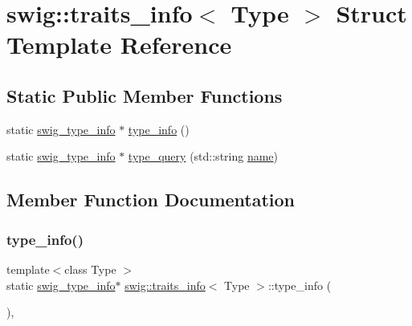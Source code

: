 \hypertarget{structswig_1_1traits__info}{}\section{swig\+:\+:traits\+\_\+info$<$ Type $>$ Struct Template Reference}
\label{structswig_1_1traits__info}
\subsection*{Static Public Member Functions}
\begin{DoxyCompactItemize}
\item 
static \hyperlink{structswig__type__info}{swig\+\_\+type\+\_\+info} $\ast$ \hyperlink{structswig_1_1traits__info_acfa11e9ee91b0e0319bf8a3707f71084}{type\+\_\+info} ()
\item 
static \hyperlink{structswig__type__info}{swig\+\_\+type\+\_\+info} $\ast$ \hyperlink{structswig_1_1traits__info_a2616554081419ccfe7f4396f1b8656f9}{type\+\_\+query} (std\+::string \hyperlink{lp__lib_8h_a2946c588fc7fa2fa5b43ac54b7872725}{name})
\end{DoxyCompactItemize}


\subsection{Member Function Documentation}
\mbox{\label{structswig_1_1traits__info_acfa11e9ee91b0e0319bf8a3707f71084}} 
\subsubsection{\texorpdfstring{type\+\_\+info()}{type\_info()}}
{\footnotesize\ttfamily template$<$class Type $>$ \\
static \hyperlink{structswig__type__info}{swig\+\_\+type\+\_\+info}$\ast$ \hyperlink{structswig_1_1traits__info}{swig\+::traits\+\_\+info}$<$ Type $>$\+::type\+\_\+info (\begin{DoxyParamCaption}{ }\end{DoxyParamCaption})\hspace{0.3cm}{\ttfamily [inline]}, {\ttfamily [static]}}

\mbox{\label{structswig_1_1traits__info_a2616554081419ccfe7f4396f1b8656f9}} 
